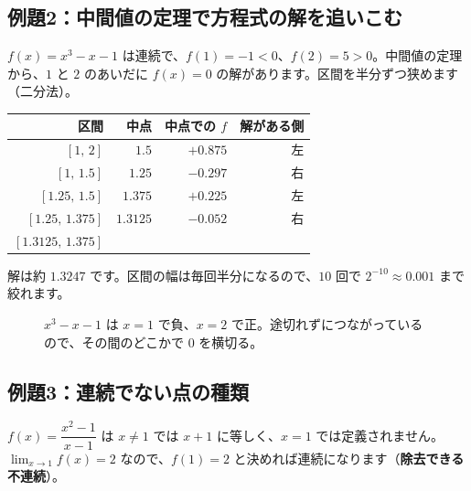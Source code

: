 \documentclass[a4paper,11pt,openany]{ltjsbook}
\begin{document}
\subsection*{例題2：中間値の定理で方程式の解を追いこむ}

$f(x)=x^3-x-1$ は連続で、$f(1)=-1<0$、$f(2)=5>0$。中間値の定理から、$1$ と $2$ のあいだに $f(x)=0$ の解があります。区間を半分ずつ狭めます（二分法）。

\begin{center}
\begin{tabular}{rrrr}
\toprule
区間 & 中点 & 中点での $f$ & 解がある側\\
\midrule
$[1,\,2]$ & $1.5$ & $+0.875$ & 左\\
$[1,\,1.5]$ & $1.25$ & $-0.297$ & 右\\
$[1.25,\,1.5]$ & $1.375$ & $+0.225$ & 左\\
$[1.25,\,1.375]$ & $1.3125$ & $-0.052$ & 右\\
$[1.3125,\,1.375]$ & & & \\
\bottomrule
\end{tabular}
\end{center}

解は約 $1.3247$ です。区間の幅は毎回半分になるので、$10$ 回で $2^{-10}\approx0.001$ まで絞れます。

\begin{figure}[htbp]
\centering
{}
\caption{$x^3-x-1$ は $x=1$ で負、$x=2$ で正。途切れずにつながっているので、その間のどこかで $0$ を横切る。}
\end{figure}

\subsection*{例題3：連続でない点の種類}

$f(x)=\dfrac{x^2-1}{x-1}$ は $x\neq1$ では $x+1$ に等しく、$x=1$ では定義されません。$\lim_{x\to1}f(x)=2$ なので、$f(1)=2$ と決めれば連続になります（\textbf{除去できる不連続}）。
\end{document}

